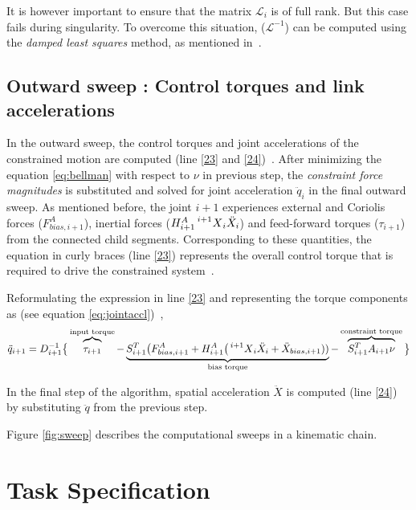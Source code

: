 It is however important to ensure that the matrix $\mathcal{L}_i$ is of full rank. But this case fails during singularity. To overcome this situation, ($\mathcal{L}^{-1}$) can be computed using the \textit{damped least squares} method, as mentioned in~\cite{shakhimardanov2015composable}.

\subsection{Outward sweep : Control torques and link accelerations}
In the outward sweep, the control torques and joint accelerations of the constrained motion are computed (line \ref{23} and \ref{24})~\cite{shakhimardanov2015composable}. After minimizing the equation \ref{eq:bellman} with respect to $\nu$ in previous step, the \textit{constraint force magnitudes} is substituted and solved for joint acceleration $\ddot{q}_i$ in the final outward sweep. As mentioned before, the joint $i+1$ experiences external and Coriolis forces ($F_{bias, i+1}^A$), inertial forces ($H_{i+1}^A\prescript{i+1}{}{X}_i \ddot{X}_i$) and feed-forward torques ($\tau_{i+1}$) from the connected child segments. Corresponding to these quantities, the equation in curly braces (line \ref{23}) represents the overall control torque that is required to drive the constrained system~\cite{vukcevic2018extending}.

Reformulating the expression in line \ref{23} and representing the torque components as (see equation \ref{eq:jointaccl})~\cite{vukcevic2018extending},
\begin{equation}\label{eq:jointaccl}
	\ddot{q}_{i+1} = D_{i+1}^{-1} \big\{ \overbrace{\strut \tau_{i+1}}^\text{input torque} - \underbrace{ \strut S_{i+1}^T \big(F_{bias, i+1}^A + H_{i+1}^A \big(\prescript{i+1}{}{X}_i \ddot{X}_i + \ddot{X}_{bias, i+1}))}_\text{bias torque} - \overbrace{\strut S_{i+1}^T A_{i+1} \nu}^\text{constraint torque} \big \}
\end{equation}

In the final step of the algorithm, spatial acceleration $\ddot{X}$ is computed (line \ref{24}) by substituting $\ddot{q}$ from the previous step. 

Figure \ref{fig:sweep} describes the computational sweeps in a kinematic chain.


\section{Task Specification}

